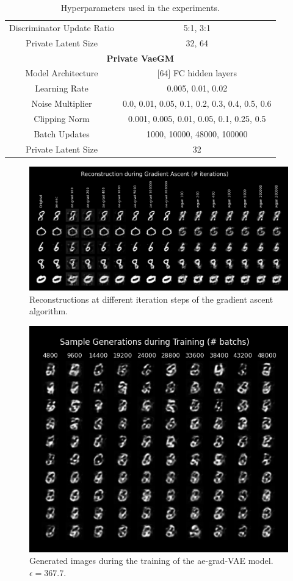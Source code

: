 \documentclass{article}
\begin{document}
\begin{table}[!h]
\begin{tabular}[!h]{|c|c|}
        Discriminator Update Ratio & 5:1, 3:1\\
        Private Latent Size & 32, 64\\
        \hline
        \hline
        \multicolumn{2}{|c|}{\textbf{Private VaeGM}}\\
        \hline
        Model Architecture & [64] FC hidden layers\\
        Learning Rate & 0.005, 0.01, 0.02\\
        Noise Multiplier & 0.0, 0.01, 0.05, 0.1, 0.2, 0.3, 0.4, 0.5, 0.6\\
        Clipping Norm & 0.001, 0.005, 0.01, 0.05, 0.1, 0.25, 0.5\\
        Batch Updates & 1000, 10000, 48000, 100000\\
        Private Latent Size & 32\\
        \hline
    \end{tabular}
    \caption{Hyperparameters used in the experiments.}
    \label{table:hyperparameters}
\end{table}

\begin{figure}[!h]
    \centering
    \includegraphics[width=0.8\columnwidth]{images/gradient_ascent.png}
    \caption{Reconstructions at different iteration steps of the gradient ascent algorithm.}
    \label{fig:gradient_ascent}
\end{figure}



\begin{figure}[!h]
    \centering
    \includegraphics[width=0.6\columnwidth]{images/during_train_367_7.png}
    \caption{Generated images during the training of the ae-grad-VAE model. $\epsilon = 367.7$.}
    \label{fig:during_train_367_7}
\end{figure}
\end{document}
